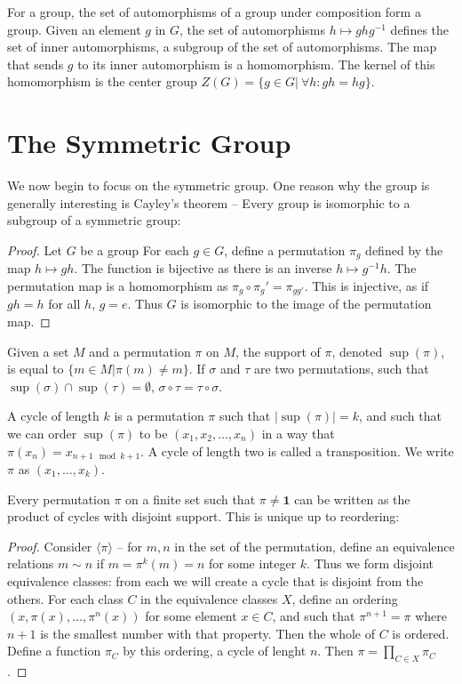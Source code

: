 \documentclass{report}
\begin{document}
For a group, the set of automorphisms of a group under composition form a group. Given an element $g$ in $G$, the set of automorphisms $h \mapsto ghg^{-1}$ defines the set of inner automorphisms, a subgroup of the set of automorphisms. The map that sends $g$ to its inner automorphism is a homomorphism. The kernel of this homomorphism is the center group $Z(G) = \{ g \in G |\ \forall h: gh = hg \}$.

\chapter{The Symmetric Group}

We now begin to focus on the symmetric group. One reason why the group is generally interesting is Cayley's theorem -- Every group is isomorphic to a subgroup of a symmetric group:
\begin{proof}
    Let $G$ be a group For each $g \in G$, define a permutation $\pi_g$ defined by the map $h \mapsto gh$. The function is bijective as there is an inverse $h \mapsto g^{-1}h$. The permutation map is a homomorphism as $\pi_g \circ \pi_g' = \pi_{gg'}$. This is injective, as if $gh = h$ for all $h$, $g = e$. Thus $G$ is isomorphic to the image of the permutation map.
\end{proof}

Given a set $M$ and a permutation $\pi$ on $M$, the support of $\pi$, denoted $\sup(\pi)$, is equal to $\{ m \in M | \pi(m) \neq m \}$. If $\sigma$ and $\tau$ are two permutations, such that $\sup(\sigma) \cap \sup(\tau) = \emptyset$, $\sigma \circ \tau = \tau \circ \sigma$.

A cycle of length $k$ is a permutation $\pi$ such that $|\sup(\pi)| = k$, and such that we can order $\sup(\pi)$ to be $(x_1, x_2, \dots, x_n)$ in a way that $\pi(x_n) = x_{n+1 \mod k+1}$. A cycle of length two is called a transposition. We write $\pi$ as $(x_1, \dots, x_k)$.

Every permutation $\pi$ on a finite set such that $\pi \neq \mathbf{1}$ can be written as the product of cycles with disjoint support. This is unique up to reordering:
\begin{proof}
    Consider $\langle \pi \rangle$ -- for $m,n$ in the set of the permutation, define an equivalence relations $m \sim n$ if $m = \pi^k(m) = n$ for some integer $k$. Thus we form disjoint equivalence classes: from each we will create a cycle that is disjoint from the others. For each class $C$ in the equivalence classes $X$, define an ordering $(x, \pi(x), \dots, \pi^n(x))$ for some element $x \in C$, and such that $\pi^{n+1} = \pi$ where $n+1$ is the smallest number with that property. Then the whole of $C$ is ordered. Define a function $\pi_C$ by this ordering, a cycle of lenght $n$. Then $\pi = \prod_{C \in X}\pi_C$.
\end{proof}
\end{document}
